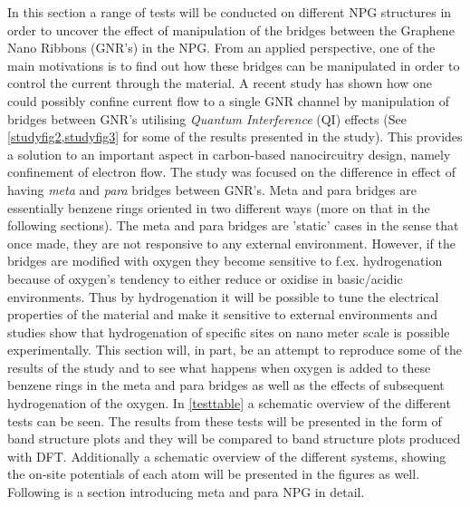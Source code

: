 In this section a range of tests will be conducted on different NPG structures in order to uncover the effect of manipulation of the bridges between the Graphene Nano Ribbons (GNR's) in the NPG. From an applied perspective, one of the main motivations is to find out how these bridges can be manipulated in order to control the current through the material. A recent study has shown how one could possibly confine current flow to a single GNR channel by manipulation of bridges between GNR's utilising \textit{Quantum Interference} (QI) effects (See \cref{studyfig2,studyfig3} for some of the results presented in the study). This provides a solution to an important aspect in carbon-based nanocircuitry design, namely confinement of electron flow. The study was focused on the difference in effect of having \textit{meta} and \textit{para} bridges between GNR's. Meta and para bridges are essentially benzene rings oriented in two different ways (more on that in the following sections). The meta and para bridges are 'static' cases in the sense that once made, they are not responsive to any external environment. However, if the bridges are modified with oxygen they become sensitive to f.ex. hydrogenation because of oxygen's tendency to either reduce or oxidise in basic/acidic environments. Thus by hydrogenation it will be possible to tune the electrical properties of the material and make it sensitive to external environments and studies show that hydrogenation of specific sites on nano meter scale is possible experimentally. This section will, in part, be an attempt to reproduce some of the results of the study and to see what happens when oxygen is added to these benzene rings in the meta and para bridges as well as the effects of subsequent hydrogenation of the oxygen.  In \cref{testtable} a schematic overview of the different tests can be seen. The results from these tests will be presented in the form of band structure plots and they will be compared to band structure plots produced with DFT. Additionally a schematic overview of the different systems, showing the on-site potentials of each atom will be presented in the figures as well. Following is a section introducing meta and para NPG in detail. 
